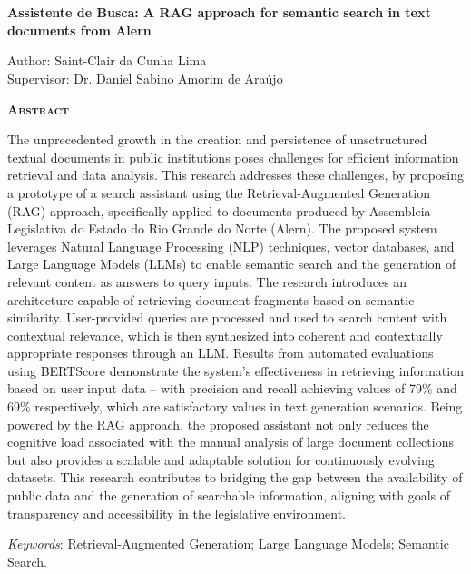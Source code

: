 \chapter*{}
\begin{center}
	{\Large{\textbf{Assistente de Busca: A RAG approach for semantic search in text documents from Alern}}}
\end{center}

\vspace{1cm}

\begin{flushright}
	Author: Saint-Clair da Cunha Lima\\
	Supervisor: Dr. Daniel Sabino Amorim de Araújo
\end{flushright}

\vspace{1cm}

\begin{center}
	\Large{\textsc{\textbf{Abstract}}}
\end{center}

\noindent 
The unprecedented growth in the creation and persistence of unsctructured textual documents in public institutions poses challenges for efficient information retrieval and data analysis. This research addresses these challenges, by proposing a prototype of a search assistant using the Retrieval-Augmented Generation (RAG) approach, specifically applied to documents produced by Assembleia Legislativa do Estado do Rio Grande do Norte (Alern). The proposed system leverages Natural Language Processing (NLP) techniques, vector databases, and Large Language Models (LLMs) to enable semantic search and the generation of relevant content as answers to query inputs. The research introduces an architecture capable of retrieving document fragments based on semantic similarity. User-provided queries are processed and used to search content with contextual relevance, which is then synthesized into coherent and contextually appropriate responses through an LLM. Results from automated evaluations using BERTScore demonstrate the system's effectiveness in retrieving information based on user input data -- with precision and recall achieving values of 79\% and 69\% respectively, which are satisfactory values in text generation scenarios. Being powered by the RAG approach, the proposed assistant not only reduces the cognitive load associated with the manual analysis of large document collections but also provides a scalable and adaptable solution for continuously evolving datasets. This research contributes to bridging the gap between the availability of public data and the generation of searchable information, aligning with goals of transparency and accessibility in the legislative environment.

\noindent\textit{Keywords}: Retrieval-Augmented Generation; Large Language Models; Semantic Search.